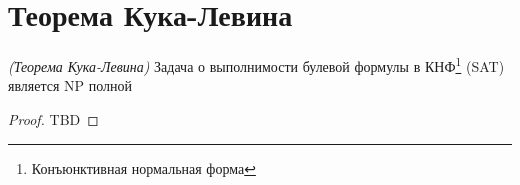 \section{Теорема Кука-Левина}
\label{addCookTheorem}

\begin{theorem}
\emph{(Теорема Кука-Левина)}
Задача о выполнимости булевой формулы в КНФ\footnote{Конъюнктивная нормальная форма} (SAT) является NP полной
\end{theorem}

\begin{proof}
TBD
\end{proof}
